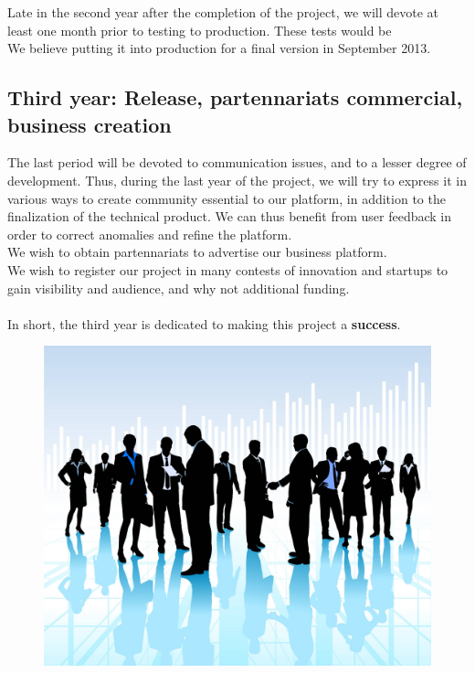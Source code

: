 \documentclass {life-en}
\begin{document}
Late in the second year after the completion of the project, we will devote at least one month prior to testing to production. These tests would be \\
We believe putting it into production for a final version in September 2013.\\

\newpage

\subsection{Third year: Release, partennariats commercial, business creation}

The last period will be devoted to communication issues, and to a lesser degree of development. Thus, during the last year of the project, we will try to express it in various ways to create community essential to our platform, in addition to the finalization of the technical product. We can thus benefit from user feedback in order to correct anomalies and refine the platform.\\
We wish to obtain partennariats to advertise our business platform.\\
We wish to register our project in many contests of innovation and startups to gain visibility and audience, and why not additional funding.\\
\\
In short, the third year is dedicated to making this project a \textbf{success}.

\begin{figure} [H]
  \begin{center}
    \includegraphics [width = 12cm]{img/corporate.jpg}
  \end{center}
\end{figure}
\end{document}
